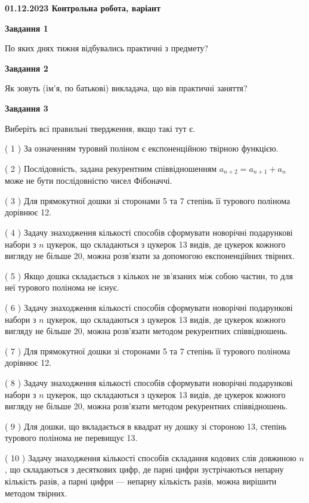 \documentclass[12pt, ukrainian]{article}
\begin{document}
\begin {large}

\textbf{01.12.2023 Контрольна робота, варіант  }\par


{
{\begin {center}\textbf{Завдання 1}\end {center}}\par
По яких днях тижня відбувались практичні з предмету?\par
{\begin {center}\textbf{Завдання 2}\end {center}}\par
Як зовуть (ім'я, по батькові) викладача, що вів практичні заняття?\par
{\begin {center}\textbf{Завдання 3}\end {center}}\par
Виберіть всі правильні твердження, якщо такі тут є.\par
\vspace{2mm}
( 1 ) За означенням туровий поліном є експоненційною твірною функцією.%

( 2 ) Послідовність, задана рекурентним співвідношенням $a_{n+2}=a_{n+1}+a_{n}$ може не бути послідовністю чисел Фібоначчі.%

( 3 ) Для прямокутної дошки зі сторонами 5 та 7 степінь її турового полінома дорівнює 12.%

( 4 ) Задачу знаходження кількості способів сформувати новорічні подарункові набори з $n$ цукерок, що складаються з цукерок 13 видів, де цукерок кожного вигляду не більше 20, можна розв’язати за допомогою експоненційних твірних.%

( 5 ) Якщо дошка складається з кількох не зв’язаних між собою частин, то для неї турового полінома не існує.%

( 6 ) Задачу знаходження кількості способів сформувати новорічні подарункові набори з $n$ цукерок, що складаються з цукерок 13 видів, де цукерок кожного вигляду не більше 20, можна розв’язати методом рекурентних співвідношень.%

( 7 ) Для прямокутної дошки зі сторонами 5 та 7 степінь її турового полінома дорівнює 12.%

( 8 ) Задачу знаходження кількості способів сформувати новорічні подарункові набори з $n$ цукерок, що складаються з цукерок 13 видів, де цукерок кожного вигляду не більше 20, можна розв’язати методом рекурентних співвідношень.%

( 9 ) Для дошки, що вкладається в квадрат ну дошку зі стороною 13, степінь турового полінома не перевищує 13.%

( 10 ) Задачу знаходження кількості способів складання кодових слів довжиною $n$, що складаються з десяткових цифр, де парні цифри зустрічаються непарну кількість разів, а парні цифри — непарну кількість разів, можна вирішити методом твірних.%
}
\end {large}

\vspace{4mm}
\newpage
\end{document}
